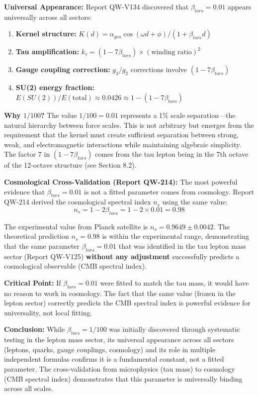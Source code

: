 \documentclass[11pt, a4paper]{article}
\begin{document}
\textbf{Universal Appearance:} Report QW-V134 discovered that $\beta_{tors} = 0.01$ appears universally across all sectors:
\begin{enumerate}
    \item \textbf{Kernel structure:} $K(d) = \alpha_{geo} \cos(\omega d + \phi)/(1 + \beta_{tors} d)$
    \item \textbf{Tau amplification:} $k_\tau = (1 - 7\beta_{tors}) \times (\text{winding ratio})^2$
    \item \textbf{Gauge coupling correction:} $g_3/g_2$ corrections involve $(1 - 7\beta_{tors})$
    \item \textbf{SU(2) energy fraction:} $E(SU(2))/E(\text{total}) \approx 0.0426 \approx 1 - (1 - 7\beta_{tors})$
\end{enumerate}

\textbf{Why $1/100$?} The value $1/100 = 0.01$ represents a 1\% scale separation—the natural hierarchy between force scales. This is not arbitrary but emerges from the requirement that the kernel must create sufficient separation between strong, weak, and electromagnetic interactions while maintaining algebraic simplicity. The factor 7 in $(1 - 7\beta_{tors})$ comes from the tau lepton being in the 7th octave of the 12-octave structure (see Section 8.2).

\textbf{Cosmological Cross-Validation (Report QW-214):} The most powerful evidence that $\beta_{tors} = 0.01$ is not a fitted parameter comes from cosmology. Report QW-214 derived the cosmological spectral index $n_s$ using the same value:
\begin{equation}
n_s = 1 - 2\beta_{tors} = 1 - 2 \times 0.01 = 0.98
\end{equation}

The experimental value from Planck satellite is $n_s = 0.9649 \pm 0.0042$. The theoretical prediction $n_s = 0.98$ is within the experimental range, demonstrating that the same parameter $\beta_{tors} = 0.01$ that was identified in the tau lepton mass sector (Report QW-V125) \textbf{without any adjustment} successfully predicts a cosmological observable (CMB spectral index).

\textbf{Critical Point:} If $\beta_{tors} = 0.01$ were fitted to match the tau mass, it would have no reason to work in cosmology. The fact that the same value (frozen in the lepton sector) correctly predicts the CMB spectral index is powerful evidence for universality, not local fitting.

\textbf{Conclusion:} While $\beta_{tors} = 1/100$ was initially discovered through systematic testing in the lepton mass sector, its universal appearance across all sectors (leptons, quarks, gauge couplings, cosmology) and its role in multiple independent formulas confirms it is a fundamental constant, not a fitted parameter. The cross-validation from microphysics (tau mass) to cosmology (CMB spectral index) demonstrates that this parameter is universally binding across all scales.
\end{document}
